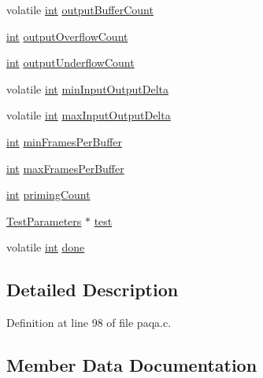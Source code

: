 \begin{DoxyCompactItemize}
volatile \hyperlink{xmltok_8h_a5a0d4a5641ce434f1d23533f2b2e6653}{int} \hyperlink{struct_loopback_context__s_a74498622d40b9836000d25d9ea1526e4}{output\+Buffer\+Count}
\item 
\hyperlink{xmltok_8h_a5a0d4a5641ce434f1d23533f2b2e6653}{int} \hyperlink{struct_loopback_context__s_af4dcbf79647e5e12b2ea190604e2446f}{output\+Overflow\+Count}
\item 
\hyperlink{xmltok_8h_a5a0d4a5641ce434f1d23533f2b2e6653}{int} \hyperlink{struct_loopback_context__s_ab7442ac9e2fb4fc8470a99b044ca9c48}{output\+Underflow\+Count}
\item 
volatile \hyperlink{xmltok_8h_a5a0d4a5641ce434f1d23533f2b2e6653}{int} \hyperlink{struct_loopback_context__s_a64264d4030bebe2fa1fcec8b6150a3ec}{min\+Input\+Output\+Delta}
\item 
volatile \hyperlink{xmltok_8h_a5a0d4a5641ce434f1d23533f2b2e6653}{int} \hyperlink{struct_loopback_context__s_a1d85ea7f97a8ab0b024451c8e90018bd}{max\+Input\+Output\+Delta}
\item 
\hyperlink{xmltok_8h_a5a0d4a5641ce434f1d23533f2b2e6653}{int} \hyperlink{struct_loopback_context__s_ae1f03610d07860b490e0fc84d4e220a2}{min\+Frames\+Per\+Buffer}
\item 
\hyperlink{xmltok_8h_a5a0d4a5641ce434f1d23533f2b2e6653}{int} \hyperlink{struct_loopback_context__s_a9b53739778a392b17c069ebd07833384}{max\+Frames\+Per\+Buffer}
\item 
\hyperlink{xmltok_8h_a5a0d4a5641ce434f1d23533f2b2e6653}{int} \hyperlink{struct_loopback_context__s_abbc3201a17c8ae320d92963061d0325a}{priming\+Count}
\item 
\hyperlink{paqa_8c_a2382d9450082ea3a30a2110eda2d77f6}{Test\+Parameters} $\ast$ \hyperlink{struct_loopback_context__s_af4a5c6b30136380162dfafcb9287020b}{test}
\item 
volatile \hyperlink{xmltok_8h_a5a0d4a5641ce434f1d23533f2b2e6653}{int} \hyperlink{struct_loopback_context__s_a46672c5851dcece86dd45040fc271e99}{done}
\end{DoxyCompactItemize}


\subsection{Detailed Description}


Definition at line 98 of file paqa.\+c.



\subsection{Member Data Documentation}

